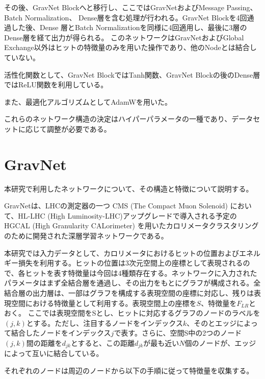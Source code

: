 その後、GravNet Blockへと移行し、ここではGravNetおよびMessage Passing、 Batch Normalization、 Dense層を含む処理が行われる。GravNet Blockを4回通過した後、Dense 層とBatch Normalizationを同様に4回適用し、最後に3層のDense層を経て出力が得られる。
このネットワークはGravNetおよびGlobal Exchange以外はヒットの特徴量のみを用いた操作であり、他のNodeとは結合していない。

活性化関数として、GravNet BlockではTanh関数、GravNet Blockの後のDense層ではReLU関数を利用している。

また、最適化アルゴリズムとしてAdamWを用いた。

これらのネットワーク構造の決定はハイパーパラメータの一種であり、データセットに応じて調整が必要である。


\section{GravNet}

本研究で利用したネットワークについて、その構造と特徴について説明する。

GravNetは、LHCの測定器の一つ CMS (The Compact Muon Solenoid) において、HL-LHC (High Luminosity-LHC)アップグレードで導入される予定のHGCAL (High Granularity CALorimeter) を用いたカロリメータクラスタリングのために開発された深層学習ネットワークである。

本研究では入力データとして、カロリメータにおけるヒットの位置およびエネルギー損失を利用する。ヒットの位置は3次元空間上の座標として表現されるので、各ヒットを表す特徴量は今回は4種類存在する。ネットワークに入力されたパラメータはまず全結合層を通過し、その出力をもとにグラフが構成される。全結合層の出力層は、一部はグラフを構成する表現空間の座標に対応し、残りは表現空間における特徴量として利用する。表現空間上の座標を$S$、特徴量を$F_{LR}$とおく。
ここでは表現空間をSとし、ヒットに対応するグラフのノードのラベルを $(j,k)$とする。ただし、注目するノードをインデックス$k$、そのとエッジによって結合したノードをインデックス$j$で表す。さらに、空間S中の2つのノード$(j,k)$間の距離を$d_{jk}$とすると、この距離$d_{jk}$が最も近い$N$個のノードが、エッジによって互いに結合している。

それぞれのノードは周辺のノードから以下の手順に従って特徴量を収集する。

